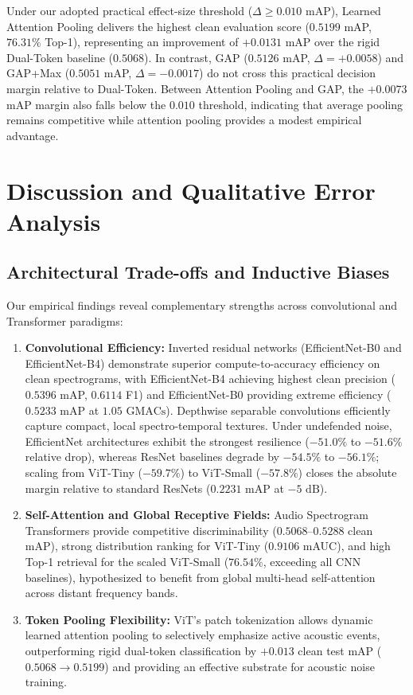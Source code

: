 \documentclass[11pt,a4paper]{article}
\begin{document}
Under our adopted practical effect-size threshold ($\Delta \ge 0.010$ mAP), Learned Attention Pooling delivers the highest clean evaluation score ($0.5199$ mAP, $76.31\%$ Top-1), representing an improvement of $+0.0131$ mAP over the rigid Dual-Token baseline ($0.5068$). In contrast, GAP ($0.5126$ mAP, $\Delta = +0.0058$) and GAP+Max ($0.5051$ mAP, $\Delta = -0.0017$) do not cross this practical decision margin relative to Dual-Token. Between Attention Pooling and GAP, the $+0.0073$ mAP margin also falls below the $0.010$ threshold, indicating that average pooling remains competitive while attention pooling provides a modest empirical advantage.


\section{Discussion and Qualitative Error Analysis}

\subsection{Architectural Trade-offs and Inductive Biases}
Our empirical findings reveal complementary strengths across convolutional and Transformer paradigms:
\begin{enumerate}
    \item \textbf{Convolutional Efficiency:} Inverted residual networks (EfficientNet-B0 and EfficientNet-B4) demonstrate superior compute-to-accuracy efficiency on clean spectrograms, with EfficientNet-B4 achieving highest clean precision ($0.5396$ mAP, $0.6114$ F1) and EfficientNet-B0 providing extreme efficiency ($0.5233$ mAP at $1.05\text{ GMACs}$). Depthwise separable convolutions efficiently capture compact, local spectro-temporal textures. Under undefended noise, EfficientNet architectures exhibit the strongest resilience ($-51.0\%$ to $-51.6\%$ relative drop), whereas ResNet baselines degrade by $-54.5\%$ to $-56.1\%$; scaling from ViT-Tiny ($-59.7\%$) to ViT-Small ($-57.8\%$) closes the absolute margin relative to standard ResNets ($0.2231$ mAP at $-5\text{ dB}$).
    \item \textbf{Self-Attention and Global Receptive Fields:} Audio Spectrogram Transformers provide competitive discriminability ($0.5068\text{--}0.5288$ clean mAP), strong distribution ranking for ViT-Tiny ($0.9106$ mAUC), and high Top-1 retrieval for the scaled ViT-Small ($76.54\%$, exceeding all CNN baselines), hypothesized to benefit from global multi-head self-attention across distant frequency bands.
    \item \textbf{Token Pooling Flexibility:} ViT's patch tokenization allows dynamic learned attention pooling to selectively emphasize active acoustic events, outperforming rigid dual-token classification by $+0.013$ clean test mAP ($0.5068 \to 0.5199$) and providing an effective substrate for acoustic noise training.
\end{enumerate}
\end{document}
